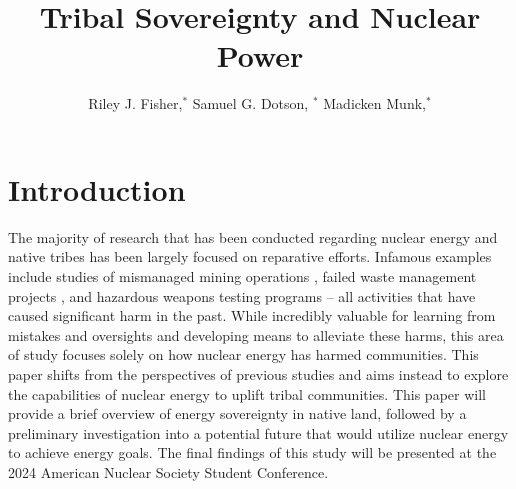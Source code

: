 \documentclass{anstrans}
\title{Tribal Sovereignty and Nuclear Power}
\author{Riley J. Fisher,$^{*}$ Samuel G. Dotson, $^{*}$ Madicken Munk,$^{*}$}
\institute{ $^{*}$Dept. of Nuclear, Plasma, and Radiological Engineering,
University of Illinois at Urbana-Champaign, Urbana, IL 61801 }
\begin{document}


\section{Introduction}
The majority of research that has been conducted regarding nuclear energy and
native tribes has been largely focused on reparative efforts. Infamous examples
include studies of mismanaged mining operations \cite{hoover_elevated_2017},
failed waste management projects \cite{endres_sacred_2012}, and hazardous
weapons testing programs \cite{frohmberg_assessment_2000} – all activities that
have caused significant harm in the past. While incredibly valuable for learning
from mistakes and oversights and developing means to alleviate these harms, this
area of study focuses solely on how nuclear energy has harmed communities. This
paper shifts from the perspectives of previous studies and aims instead to
explore the capabilities of nuclear energy to uplift tribal communities. This
paper will provide a brief overview of energy sovereignty in native land,
followed by a preliminary investigation into a potential future that would
utilize nuclear energy to achieve energy goals. The final findings of this study
will be presented at the 2024 American Nuclear Society Student Conference. 
\end{document}

